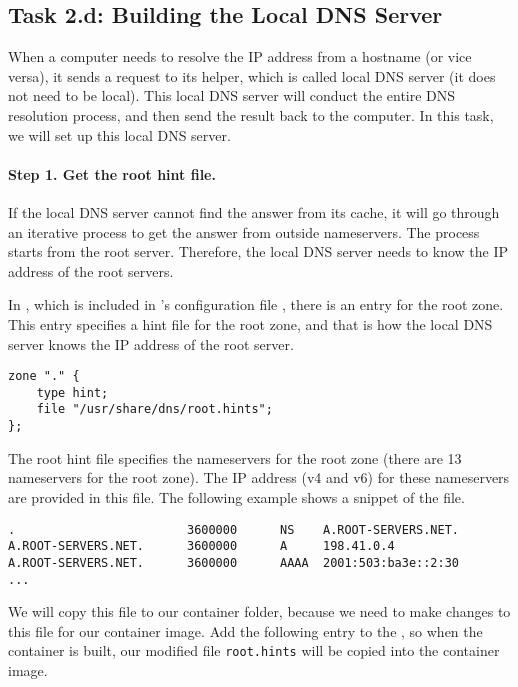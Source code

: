 \subsection{Task 2.d: Building the Local DNS Server} 

When a computer needs to resolve the IP address from a hostname (or vice versa),
it sends a request to its helper, which is called local DNS server (it
does not need to be local).  This local DNS server will conduct the 
entire DNS resolution process, and then send the result back to the computer. 
In this task, we will set up this local DNS server. 


\paragraph{Step 1. Get the root hint file.}

If the local DNS server cannot find the answer from its cache, it 
will go through an iterative process to get the answer from outside 
nameservers.  The process starts from the root server. 
Therefore, the local DNS server needs to
know the IP address of the root servers. 


In , which is included 
in \bind's configuration file , there is an 
entry for the root zone. This entry specifies a hint file for the
root zone, and that is how the local DNS server knows the IP address of the
root server. 


\begin{lstlisting}
zone "." {
	type hint;
	file "/usr/share/dns/root.hints";
};
\end{lstlisting}
 
The root hint file specifies the nameservers for the 
root zone (there are 13 nameservers for the root zone). The 
IP address (v4 and v6) for these nameservers are provided in this file. 
The following example shows a snippet of the file. 


\begin{lstlisting}
.                        3600000      NS    A.ROOT-SERVERS.NET.
A.ROOT-SERVERS.NET.      3600000      A     198.41.0.4
A.ROOT-SERVERS.NET.      3600000      AAAA  2001:503:ba3e::2:30
...
\end{lstlisting}


We will copy this file to our container folder, because we need to make changes
to this file for our container image. Add the 
following entry to the \dockerfile, so when the container is built, our 
modified file \texttt{root.hints} will be copied into the container
image. 


